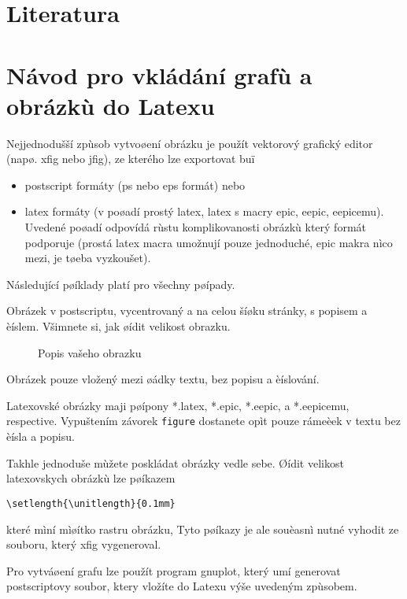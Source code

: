\documentclass[12pt]{article}
\begin{document}
\section{Literatura}

\appendix

\section{Návod pro vkládání grafù a obrázkù do Latexu}

Nejjednodušší zpùsob vytvoøení obrázku je použít vektorový grafický
editor (napø. xfig nebo jfig), ze kterého lze exportovat buï
\begin{itemize}
\item postscript formáty (ps nebo eps formát) nebo
\item latex formáty (v poøadí prostý latex, latex s macry epic, eepic, eepicemu). Uvedené poøadí odpovídá rùstu
komplikovanosti obrázkù který formát podporuje (prostá latex macra
umožnují pouze jednoduché, epic makra nìco mezi, je tøeba
vyzkoušet).

\end{itemize}
Následující pøíklady platí pro všechny pøípady.

Obrázek v postscriptu, vycentrovaný a na celou šíøku stránky, s
popisem a èíslem. Všimnete si, jak øídit velikost obrazku.
\begin{figure}[ht]
\epsfysize=3cm \centerline{} \caption{Popis
vašeho obrazku} \label{labelvasehoobrazku}
\end{figure}

Obrázek pouze vložený mezi øádky textu, bez popisu a èíslování.\\
\epsfxsize=1cm
\rule{0pt}{0pt}\hfill{}\hfill\rule{0pt}{0pt}

Latexovské obrázky maji pøípony *.latex, *.epic, *.eepic, a
*.eepicemu, respective.
%
Vypuštením závorek {\tt figure} dostanete opìt pouze rámeèek v textu
bez èísla a popisu.

Takhle jednoduše mùžete poskládat obrázky vedle sebe.
Øídit velikost latexovskych obrázkù lze pøíkazem
\begin{verbatim}
\setlength{\unitlength}{0.1mm}
\end{verbatim}
které mìní mìøítko rastru obrázku, Tyto pøíkazy je ale souèasnì
nutné vyhodit ze souboru, který xfig vygeneroval.

Pro vytváøení grafu lze použít program gnuplot, který umí generovat
postscriptovy soubor, ktery vložíte do Latexu výše uvedeným
zpùsobem.
\end{document}

